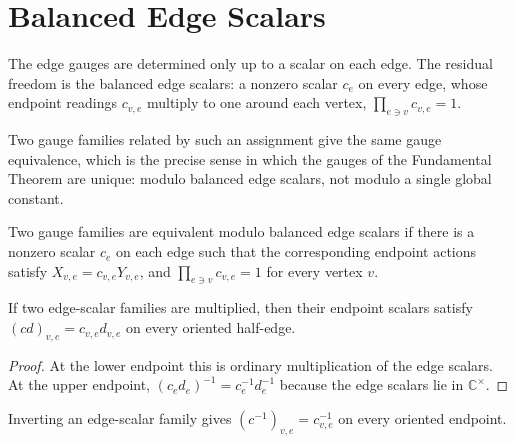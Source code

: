 \section{Balanced Edge Scalars}\label{sec:peps_balanced_edge_scalars}

The edge gauges are determined only up to a scalar on each edge. The residual
freedom is the balanced edge scalars: a nonzero scalar $c_e$ on every edge,
whose endpoint readings $c_{v,e}$ multiply to one around each vertex,
$\prod_{e\ni v}c_{v,e}=1$.
\begin{center}
    \TNPEPSVertexScalarBalance
\end{center}
Two gauge families related by such an assignment give the same gauge
equivalence, which is the precise sense in which the gauges of the Fundamental
Theorem are unique: modulo balanced edge scalars, not modulo a single global
constant.

\begin{definition}%
    \label{def:GaugeEquivModEdgeScalars}
    \leanok
    Two gauge families are equivalent modulo balanced edge scalars if there is
    a nonzero scalar $c_e$ on each edge such that the corresponding endpoint
    actions satisfy $X_{v,e}=c_{v,e}Y_{v,e}$, and
    $\prod_{e\ni v}c_{v,e}=1$ for every vertex $v$.
\end{definition}

\begin{theorem}%
    \label{thm:edgeScalarAt_mul}
    \leanok
    If two edge-scalar families are multiplied, then their endpoint scalars
    satisfy $(cd)_{v,e}=c_{v,e}d_{v,e}$ on every oriented half-edge.
    \begin{center}
        \TNPEPSEdgeGaugeOrientation
    \end{center}
\end{theorem}

\begin{proof}\leanok
    At the lower endpoint this is ordinary multiplication of the edge scalars.
    At the upper endpoint, $(c_ed_e)^{-1}=c_e^{-1}d_e^{-1}$ because the
    edge scalars lie in $\mathbb C^\times$.
\end{proof}

\begin{theorem}%
    \label{thm:edgeScalarAt_inv}
    \leanok
    Inverting an edge-scalar family gives
    $(c^{-1})_{v,e}=c_{v,e}^{-1}$ on every oriented endpoint.
\end{theorem}

